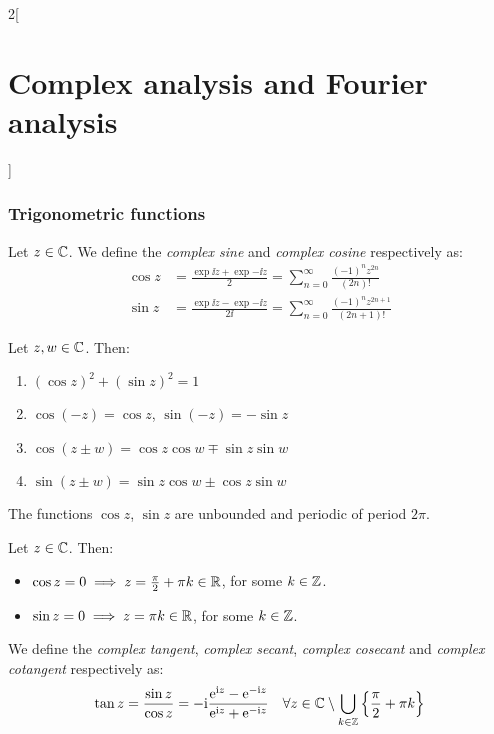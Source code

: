 \documentclass[../../../main.tex]{subfiles}
\begin{document}
\begin{multicols}{2}[\section{Complex analysis and Fourier analysis}]
  \subsubsection{Trigonometric functions}
  \begin{definition}
    Let $z\in \mathbb{C}$. We define the \emph{complex sine} and \emph{complex cosine} respectively as:
    \begin{align*}
      \cos z & =\frac{\exp{\ii z}+\exp{-\ii z}}{2}=\sum_{n=0}^\infty\frac{(-1)^nz^{2n}}{(2n)!}        \\
      \sin z & =\frac{\exp{\ii z}-\exp{-\ii z}}{2\ii}=\sum_{n=0}^\infty\frac{(-1)^nz^{2n+1}}{(2n+1)!}
    \end{align*}
  \end{definition}
  \begin{proposition}
    Let $z,w\in\mathbb{C}$. Then:
    \begin{enumerate}
      \item ${\left(\cos z\right)}^2+{\left(\sin z\right)}^2=1$
      \item $\cos(-z)=\cos z$, $\sin(-z)=-\sin z$
      \item $\cos(z \pm w) = \cos z \cos w \mp \sin z \sin w$
      \item $\sin(z \pm w) = \sin z \cos w \pm \cos z \sin w$
    \end{enumerate}
  \end{proposition}
  \begin{proposition}
    The functions $\cos z$, $\sin z$ are unbounded and periodic of period $2\pi$.
  \end{proposition}
  \begin{proposition}
    Let $z\in \mathbb{C}$. Then:
    \begin{itemize}
      \item $\cos z=0\implies z=\frac{\pi}{2}+\pi k\in\mathbb{R}$, for some $k\in\mathbb{Z}$.
      \item $\sin z=0\implies z=\pi k\in\mathbb{R}$, for some $k\in\mathbb{Z}$.
    \end{itemize}
  \end{proposition}
  \begin{definition}
    We define the \emph{complex tangent}, \emph{complex secant}, \emph{complex cosecant} and \emph{complex cotangent} respectively as:
    \begin{align*}
      \tan z & = \frac{\sin z}{\cos z}=-\ii\frac{\exp{\ii z}-\exp{-\ii z}}{\exp{\ii z}+\exp{-\ii z}}\quad \forall z\in\CC\setminus\bigcup_{k\in\ZZ}\left\{\frac{\pi}{2}+\pi k\right\} \\

\end{align*}
\end{definition}
\end{multicols}
\end{document}
